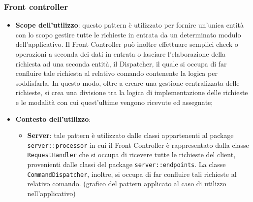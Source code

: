 	\subsubsection{Front controller} %
	\label{ssub:front_controller}
		\begin{itemize}
			\item \textbf{Scope dell'utilizzo}: questo pattern è utilizzato per fornire un'unica entità con lo scopo gestire tutte le richieste in entrata da un determinato modulo dell'applicativo. Il Front Controller può inoltre effettuare semplici check o operazioni a seconda dei dati in entrata o lasciare l'elaborazione della richiesta ad una seconda entità, il Dispatcher, il quale si occupa di far confluire tale richiesta al relativo comando contenente la logica per soddisfarla. In questo modo, oltre a creare una gestione centralizzata delle richieste, si crea una divisione tra la logica di implementazione delle richieste e le modalità con cui quest'ultime vengono ricevute ed assegnate;
			\item \textbf{Contesto dell'utilizzo}:
				\begin{itemize}
					\item \textbf{Server}: tale pattern è utilizzato dalle classi appartenenti al package \texttt{server::processor} in cui il Front Controller è rappresentato dalla classe \texttt{RequestHandler} che si occupa di ricevere tutte le richieste del client, provenienti dalle classi del package	\texttt{server::endpoints}. La classe \newline \texttt{CommandDispatcher}, inoltre, si occupa di far confluire tali richieste al relativo comando. \newline
					[TO DO] (grafico del pattern applicato al caso di utilizzo nell'applicativo)
				\end{itemize}
		\end{itemize}
